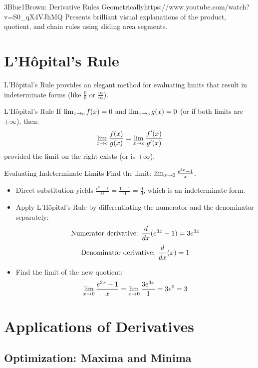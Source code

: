 \begin{videocard}{3Blue1Brown: Derivative Rules Geometrically}{https://www.youtube.com/watch?v=S0_qX4VJhMQ}
Presents brilliant visual explanations of the product, quotient, and chain rules using sliding area segments.
\end{videocard}

\section{L'Hôpital's Rule}

L'Hôpital's Rule provides an elegant method for evaluating limits that result in indeterminate forms (like $\frac{0}{0}$ or $\frac{\infty}{\infty}$).

\begin{theorembox}{L'Hôpital's Rule}
If $\lim_{x \to c} f(x) = 0$ and $\lim_{x \to c} g(x) = 0$ (or if both limits are $\pm\infty$), then:
$$\lim_{x \to c} \frac{f(x)}{g(x)} = \lim_{x \to c} \frac{f'(x)}{g'(x)}$$
provided the limit on the right exists (or is $\pm\infty$).
\end{theorembox}

\begin{examplebox}{Evaluating Indeterminate Limits}
Find the limit: $\lim_{x \to 0} \frac{e^{3x} - 1}{x}$.
\begin{itemize}
    \item Direct substitution yields $\frac{e^0 - 1}{0} = \frac{1 - 1}{0} = \frac{0}{0}$, which is an indeterminate form.
    \item Apply L'Hôpital's Rule by differentiating the numerator and the denominator separately:
    $$\text{Numerator derivative: } \frac{d}{dx}(e^{3x} - 1) = 3e^{3x}$$
    $$\text{Denominator derivative: } \frac{d}{dx}(x) = 1$$
    \item Find the limit of the new quotient:
    $$\lim_{x \to 0} \frac{e^{3x} - 1}{x} = \lim_{x \to 0} \frac{3e^{3x}}{1} = 3e^0 = 3$$
\end{itemize}
\end{examplebox}

\section{Applications of Derivatives}

\subsection{Optimization: Maxima and Minima}

